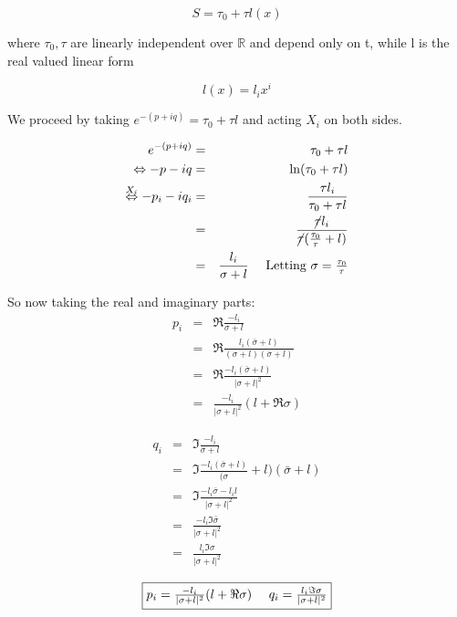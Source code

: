 \begin{displaymath}
S=\tau_0+\tau l(x)
\end{displaymath}

where ${\tau_0, \tau}$ are linearly independent over $\mathbb R$ and depend only on t, while l is the real valued linear form

\begin{displaymath}
l(x) = l_ix^i
\end{displaymath}

We proceed by taking $e^{-(p+iq)} = \tau_0 + \tau l$ and acting $X_i$ on both sides.

\begin{eqnarray}
\nonumber
e^{-(p+iq)} &=& \tau_0 + \tau l \\
\nonumber
\Leftrightarrow -p-iq&=& \ln (\tau_0+\tau l) \\
\nonumber
\stackrel{X_i}{\Leftrightarrow} -p_i-iq_i &=& \frac{\tau l_i}{\tau_0+\tau l} \\
\nonumber
&=& \frac{\cancel{\tau}l_i}{\cancel{\tau}(\frac{\tau_0}{\tau}+l)}\\
\nonumber
&=& \frac{l_i}{\sigma + l} \mbox{\ \ \ \ Letting $\sigma = \frac{\tau_0}{\tau}$}
\end{eqnarray}

So now taking the real and imaginary parts:
\begin{eqnarray}
\nonumber
p_i &=& \Re\frac{-l_i}{\sigma+l} \\
\nonumber
&=& \Re\frac{l_i(\bar{\sigma}+l)}{(\sigma+l)(\bar{\sigma}+l)} \\
\nonumber
&=& \Re \frac{-l_i(\bar{\sigma} + l)}{|\sigma+l|^2} \\
\nonumber
&=& \frac{-l_i}{|\sigma+l|^2}(l+\Re \sigma)
\end{eqnarray}

\begin{eqnarray}
\nonumber
q_i &=& \Im \frac{-l_i}{\sigma + l} \\
\nonumber
&=& \Im \frac{-l_i(\bar{\sigma} +l)}{(\sigma} +l)(\bar{\sigma} +l) \\
\nonumber
&=& \Im \frac{-l_i\bar{\sigma} - l_il}{|\sigma+l|^2} \\
\nonumber
&=&\frac{-l_i\Im\bar{\sigma}}{|\sigma+l|^2} \\
\nonumber
&=&\frac{l_i\Im\sigma}{|\sigma+l|^2}
\end{eqnarray}

\begin{equation}
\framebox{$p_i = \frac{-l_i}{|\sigma+l|^2}(l+\Re \sigma) \ \ \ \ q_i = \frac{l_i\Im\sigma}{|\sigma+l|^2}$}
\label{piqi}
\end{equation}

